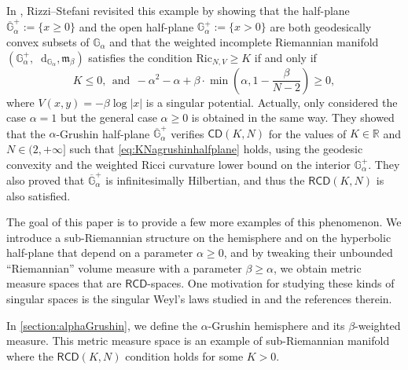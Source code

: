 \documentclass[11pt,twoside,a4paper]{article}
\newcommand{\red}{\color{red}}
\newcommand*\diff{\mathop{}\!\mathrm{d}}
\newcommand{\R}{\mathbb{R}}
\newcommand{\cd}{\mathsf{CD}}
\newcommand{\G}{\mathbb{G}}
\theoremstyle{theorem}
\theoremstyle{definition}
\theoremstyle{remark}
\theoremstyle{proof}
\begin{document}
In \cite{rizzi2023failure},
Rizzi--Stefani revisited this example by showing that the half-plane $\overline{\mathbb{G}}_\alpha^+ := \{ x \geq 0\}$ and the open half-plane $\mathbb{G}_\alpha^+ := \{ x > 0\}$ are both geodesically convex subsets of $\mathbb{G}_\alpha$ and that the weighted incomplete Riemannian manifold $(\mathbb{G}_\alpha^+, \diff_{\mathbb{G}_\alpha}, \mathfrak{m}_{\beta})$ satisfies the condition $\mathrm{Ric}_{N,V} \geq K$ if and only if
\begin{equation}
    \label{eq:KNagrushinhalfplane}
    K\leq 0,~~\text{and}~~-\alpha^2-\alpha+\beta\cdot \min\left(\alpha,1-\frac{\beta}{N-2}\right)\geq 0,
\end{equation}
where $V(x,y)=-\beta\log|x|$ is a singular potential.
Actually, \cite{rizzi2023failure} only considered the case $\alpha = 1$ but the general case $\alpha \geq 0$ is obtained in the same way.
They showed that the $\alpha$-Grushin half-plane $\overline{\G}_\alpha^+$ verifies $\cd(K,N)$ for the values of $K \in \R$ and $N \in (2, +\infty]$ such that \cref{eq:KNagrushinhalfplane} holds, using the geodesic convexity and the weighted Ricci curvature lower bound on the interior $\G_\alpha^+$. They also proved that $\overline{\G}_\alpha^+$ is infinitesimally Hilbertian, and thus the $\mathsf{RCD}(K, N)$ is also satisfied.

The goal of this paper is to provide a few more examples of this phenomenon. We introduce a sub-Riemannian structure on the hemisphere and on the hyperbolic half-plane that depend on a parameter $\alpha \geq 0$, and by tweaking their unbounded ``Riemannian'' volume measure with a parameter $\beta \geq \alpha$, we obtain metric measure spaces that are $\mathsf{RCD}$-spaces. One motivation for studying these kinds of singular spaces is the singular Weyl's laws studied in \cite{boscain-prandi-seri2016, Chitour-Prandi-Rizzi24, honda2023} and the references therein.

In \cref{section:alphaGrushin}, we define the $\alpha$-Grushin hemisphere and its $\beta$-weighted measure. This metric measure space is an example of sub-Riemannian manifold where the $\mathsf{RCD}(K, N)$ condition holds for some $K > 0$.
\end{document}
